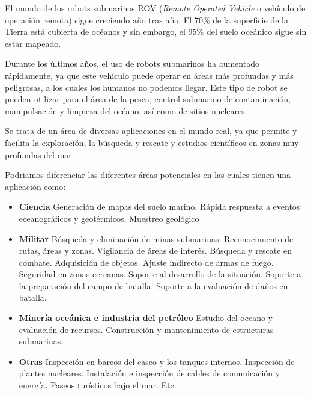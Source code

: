 El mundo de los robots submarinos ROV (\textit{Remote Operated Vehicle} o vehículo de operación remota) sigue creciendo año tras año. El 70\% de la superficie de la Tierra está cubierta de océanos y sin embargo, el 95\% del suelo oceánico sigue sin estar mapeado.

Durante los últimos años, el uso de robots submarinos ha aumentado rápidamente, ya que este vehículo puede operar en áreas más profundas y más peligrosas, a los cuales los humanos no podemos llegar. Este tipo de robot se pueden utilizar para el área de la pesca, control submarino de contaminación, manipulsación y limpieza del océano, así como de sitios nucleares.

Se trata de un área de diversas aplicaciones en el mundo real, ya que permite y facilita la exploración, la búsqueda y rescate y estudios científicos en zonas muy profundas del mar.

Podriamos diferenciar las diferentes áreas potenciales en las cuales tienen una aplicación como:

  \begin{itemize}
  \item \textbf{Ciencia}
    \subitem Generación de mapas del suelo marino.
    \subitem Rápida respuesta a eventos eceanográficos y geotérmicos.
    \subitem Muestreo geológico
  \item \textbf{Militar}
   \subitem Búsqueda y eliminación de minas submarinas. 
   \subitem Reconocimiento de rutas, áreas y zonas. 
   \subitem Vigilancia de áreas de interés. 
   \subitem Búsqueda y rescate en combate. 
   \subitem Adquisición de objetos. 
   \subitem Ajuste indirecto de armas de fuego. 
   \subitem Seguridad en zonas cercanas. 
   \subitem Soporte al desarrollo de la situación. 
   \subitem Soporte a la preparación del campo de batalla. 
   \subitem Soporte a la evaluación de daños en batalla.
  \item \textbf{Minería oceánica e industria del petróleo}
    \subitem Estudio del oceano y evaluación de recursos.
    \subitem Construcción y mantenimiento de estructuras submarinas.
  \item \textbf{Otras}
    \subitem Inspección en barcos del casco y los tanques internos.
    \subitem Inspección de plantes nucleares.
    \subitem Instalación e inspección de cables de comunicación y energía. 
    \subitem Paseos turísticos bajo el mar.
    \subitem Etc.
 \end{itemize}

